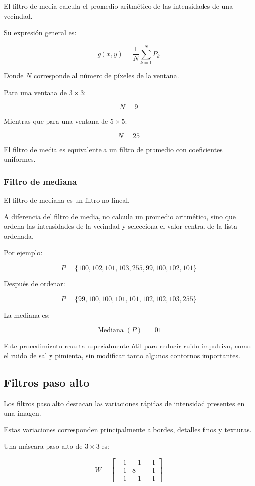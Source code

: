 \documentclass[11pt,letterpaper]{article}
\begin{document}
El filtro de media calcula el promedio aritmético
de las intensidades de una vecindad.

Su expresión general es:

\[
g(x,y)=\frac{1}{N}
\sum_{k=1}^{N}P_k
\]

Donde $N$ corresponde al número de píxeles
de la ventana.

Para una ventana de $3\times3$:

\[
N=9
\]

Mientras que para una ventana de $5\times5$:

\[
N=25
\]

El filtro de media es equivalente a un filtro
de promedio con coeficientes uniformes.

\subsubsection{Filtro de mediana}

El filtro de mediana es un filtro no lineal.

A diferencia del filtro de media, no calcula
un promedio aritmético, sino que ordena
las intensidades de la vecindad y selecciona
el valor central de la lista ordenada.

Por ejemplo:

\[
P=\{100,102,101,103,255,99,100,102,101\}
\]

Después de ordenar:

\[
P=\{99,100,100,101,101,102,102,103,255\}
\]

La mediana es:

\[
\operatorname{Mediana}(P)=101
\]

Este procedimiento resulta especialmente útil
para reducir ruido impulsivo, como el ruido
de sal y pimienta, sin modificar tanto
algunos contornos importantes.

\subsection{Filtros paso alto}

Los filtros paso alto destacan las variaciones
rápidas de intensidad presentes en una imagen.

Estas variaciones corresponden principalmente
a bordes, detalles finos y texturas.

Una máscara paso alto de $3\times3$ es:

\[
W=
\begin{bmatrix}
-1&-1&-1\\
-1&8&-1\\
-1&-1&-1
\end{bmatrix}
\]
\end{document}
